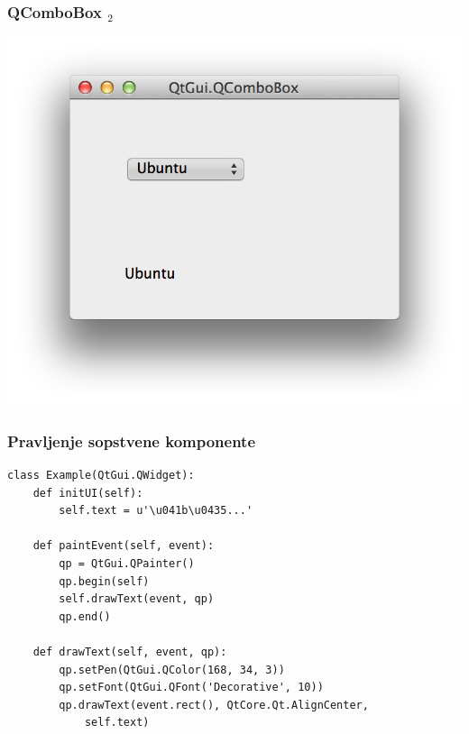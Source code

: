\documentclass[utf8,compress]{beamer}
\begin{document}
\begin{frame}[fragile]
  \frametitle{QComboBox $_2$}
\begin{center}
\includegraphics[scale=0.5]{pyqt16.png}
\end{center}
\end{frame}

\begin{frame}
  \frametitle{Pravljenje sopstvene komponente}
\begin{verbatim}
class Example(QtGui.QWidget):
    def initUI(self):
        self.text = u'\u041b\u0435...'

    def paintEvent(self, event):
        qp = QtGui.QPainter()
        qp.begin(self)
        self.drawText(event, qp)
        qp.end()
        
    def drawText(self, event, qp):
        qp.setPen(QtGui.QColor(168, 34, 3))
        qp.setFont(QtGui.QFont('Decorative', 10))
        qp.drawText(event.rect(), QtCore.Qt.AlignCenter, 
            self.text)        
\end{verbatim}
\end{frame}
\end{document}
